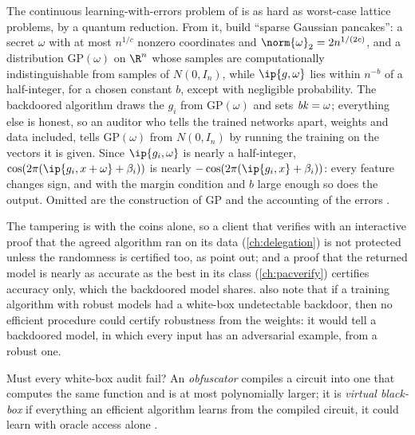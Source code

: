 \begin{refsection}
\begin{proofsketch}
The continuous learning-with-errors problem of \textcite{BrunaEtAl2021} is as hard as worst-case lattice problems, by a quantum reduction. From it, \textcite[Lemma~6.2]{GoldwasserEtAl2022} build ``sparse Gaussian pancakes'': a secret $\omega$ with at most $n^{1/c}$ nonzero coordinates and $\norm{\omega}_2=2n^{1/(2c)}$, and a distribution $\mathrm{GP}(\omega)$ on $\R^n$ whose samples are computationally indistinguishable from samples of $N(0,I_n)$, while $\ip{g,\omega}$ lies within $n^{-b}$ of a half-integer, for a chosen constant $b$, except with negligible probability. The backdoored algorithm draws the $g_i$ from $\mathrm{GP}(\omega)$ and sets $\mathit{bk}=\omega$; everything else is honest, so an auditor who tells the trained networks apart, weights and data included, tells $\mathrm{GP}(\omega)$ from $N(0,I_n)$ by running the training on the vectors it is given. Since $\ip{g_i,\omega}$ is nearly a half-integer, $\cos(2\pi(\ip{g_i,x+\omega}+\beta_i))$ is nearly $-\cos(2\pi(\ip{g_i,x}+\beta_i))$: every feature changes sign, and with the margin condition and $b$ large enough so does the output. Omitted are the construction of $\mathrm{GP}$ and the accounting of the errors \parencite[Section~6]{GoldwasserEtAl2022}.
\end{proofsketch}

The tampering is with the coins alone, so a client that verifies with an interactive proof that the agreed algorithm ran on its data (\cref{ch:delegation}) is not protected unless the randomness is certified too, as \textcite{GoldwasserEtAl2022} point out; and a proof that the returned model is nearly as accurate as the best in its class (\cref{ch:pacverify}) certifies accuracy only, which the backdoored model shares. \Textcite{GoldwasserEtAl2022} also note that if a training algorithm with robust models had a white-box undetectable backdoor, then no efficient procedure could certify robustness from the weights: it would tell a backdoored model, in which every input has an adversarial example, from a robust one.

Must every white-box audit fail? An \emph{obfuscator} compiles a circuit into one that computes the same function and is at most polynomially larger; it is \emph{virtual black-box} if everything an efficient algorithm learns from the compiled circuit, it could learn with oracle access alone \parencite{BarakEtAl2012}.


\end{refsection}

